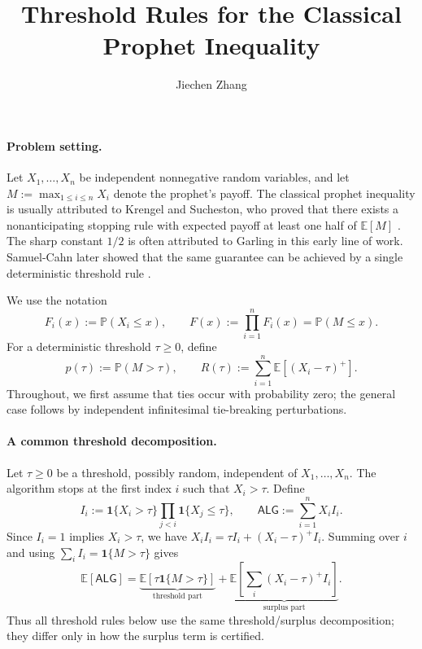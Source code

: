 \newcommand{\E}{\mathbb{E}}
\newcommand{\Prob}{\mathbb{P}}
\newcommand{\1}{\mathbf{1}}
\newcommand{\ALG}{\mathsf{ALG}}

\setlength{\parindent}{0pt}
\setlength{\parskip}{0.35em}
\setlength{\abovedisplayskip}{4pt}
\setlength{\belowdisplayskip}{4pt}
\pagestyle{empty}

\title{\Large \textbf{Threshold Rules for the Classical Prophet Inequality}}
\author{Jiechen Zhang}
\date{}


\maketitle

\paragraph{Problem setting.}
Let $X_1,\ldots,X_n$ be independent nonnegative random variables, and let $M:=\max_{1\le i\le n}X_i$ denote the prophet's payoff. The classical prophet inequality is usually attributed to Krengel and Sucheston, who proved that there exists a nonanticipating stopping rule with expected payoff at least one half of $\E[M]$ \cite{krengel1977semiamarts,krengel1978semiamarts}. The sharp constant $1/2$ is often attributed to Garling in this early line of work. Samuel-Cahn later showed that the same guarantee can be achieved by a single deterministic threshold rule \cite{samuelcahn1984threshold}.

We use the notation
\[
F_i(x):=\Prob(X_i\le x),
\qquad
F(x):=\prod_{i=1}^n F_i(x)=\Prob(M\le x).
\]
For a deterministic threshold $\tau\ge 0$, define
\[
p(\tau):=\Prob(M>\tau),
\qquad
R(\tau):=\sum_{i=1}^n \E[(X_i-\tau)^+].
\]
Throughout, we first assume that ties occur with probability zero; the general case follows by independent infinitesimal tie-breaking perturbations.

\paragraph{A common threshold decomposition.}
Let $\tau\ge 0$ be a threshold, possibly random, independent of $X_1,\ldots,X_n$. The algorithm stops at the first index $i$ such that $X_i>\tau$. Define
\[
I_i:=\1\{X_i>\tau\}\prod_{j<i}\1\{X_j\le \tau\},
\qquad
\ALG:=\sum_{i=1}^n X_iI_i.
\]
Since $I_i=1$ implies $X_i>\tau$, we have $X_iI_i=\tau I_i+(X_i-\tau)^+I_i$. Summing over $i$ and using $\sum_i I_i=\1\{M>\tau\}$ gives
\begin{equation}
\E[\ALG]
=
\underbrace{\E[\tau\1\{M>\tau\}]}_{\text{threshold part}}
+
\underbrace{\E\left[\sum_i (X_i-\tau)^+I_i\right]}_{\text{surplus part}}.
\label{eq:decomposition}
\end{equation}
Thus all threshold rules below use the same 
threshold/surplus decomposition; they differ only in how the surplus term is certified.

